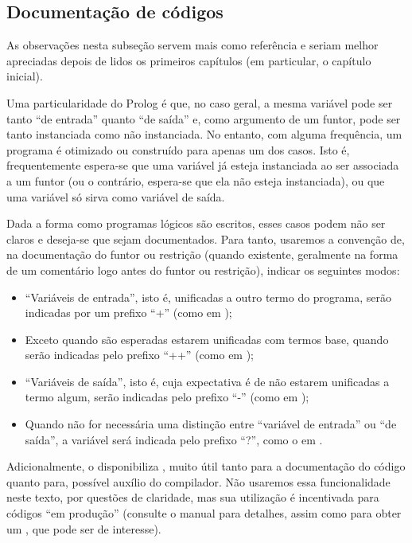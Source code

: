 \documentclass{article}
\begin{document}
\subsection*{Documentação de códigos}

As observações nesta subseção servem mais como referência e seriam
melhor apreciadas depois de lidos os primeiros capítulos (em
particular, o capítulo inicial).

Uma particularidade do Prolog é que, no caso geral, a mesma variável
pode ser tanto ``de entrada'' quanto ``de saída'' e, como argumento de
um funtor, pode ser tanto instanciada como não instanciada. No
entanto, com alguma frequência, um programa é otimizado ou construído
para apenas um dos casos. Isto é, frequentemente espera-se que uma
variável já esteja instanciada ao ser associada a um funtor (ou o
contrário, espera-se que ela não esteja instanciada), ou que uma
variável só sirva como variável de saída.

Dada a forma como programas lógicos são escritos, esses casos podem
não ser claros e deseja-se que sejam documentados. Para tanto,
usaremos a convenção de, na documentação do funtor ou restrição
(quando existente, geralmente na forma de um comentário logo antes do
funtor ou restrição), indicar os seguintes modos:

\begin{itemize}
\item ``Variáveis de entrada'', isto é, unificadas a outro termo
  do programa, serão indicadas por um prefixo ``+'' (como em
  );
\item Exceto quando são esperadas estarem unificadas com termos
  base, quando serão indicadas pelo prefixo ``++'' (como em
  );
\item ``Variáveis de saída'', isto é, cuja expectativa é de não
  estarem unificadas a termo algum, serão indicadas pelo prefixo
  ``-'' (como em );
\item Quando não for necessária uma distinção entre ``variável de
  entrada'' ou ``de saída'', a variável será indicada pelo prefixo
  ``?'', como o  em .
\end{itemize}

Adicionalmente, o \eclipse disponibiliza , muito
útil tanto para a documentação do código quanto para, possível auxílio
do compilador. Não usaremos essa funcionalidade neste texto, por
questões de claridade, mas sua utilização é incentivada para códigos
``em produção'' (consulte o manual para detalhes, assim como para
obter um , que pode ser de interesse).
\end{document}
